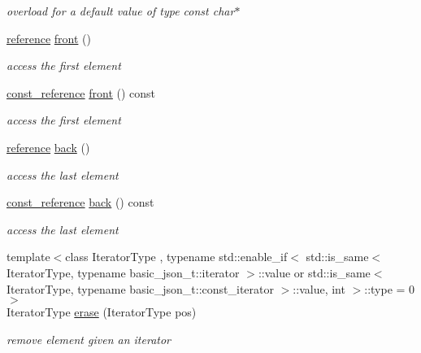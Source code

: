 \begin{DoxyCompactItemize}
\begin{DoxyCompactList}\small\item\em overload for a default value of type const char$\ast$ \end{DoxyCompactList}\item 
\hyperlink{classnlohmann_1_1basic__json_ac6a5eddd156c776ac75ff54cfe54a5bc}{reference} \hyperlink{classnlohmann_1_1basic__json_a3acba9c6ceb7214e565fe08c3ba5b352}{front} ()
\begin{DoxyCompactList}\small\item\em access the first element \end{DoxyCompactList}\item 
\hyperlink{classnlohmann_1_1basic__json_a4057c5425f4faacfe39a8046871786ca}{const\+\_\+reference} \hyperlink{classnlohmann_1_1basic__json_a4b1fb3671ade9afc8d33b2c9510acbfc}{front} () const
\begin{DoxyCompactList}\small\item\em access the first element \end{DoxyCompactList}\item 
\hyperlink{classnlohmann_1_1basic__json_ac6a5eddd156c776ac75ff54cfe54a5bc}{reference} \hyperlink{classnlohmann_1_1basic__json_a011397134847f36db0ed7d7a93753677}{back} ()
\begin{DoxyCompactList}\small\item\em access the last element \end{DoxyCompactList}\item 
\hyperlink{classnlohmann_1_1basic__json_a4057c5425f4faacfe39a8046871786ca}{const\+\_\+reference} \hyperlink{classnlohmann_1_1basic__json_a83fe4a151b3a591f357527d5d9aa1b9f}{back} () const
\begin{DoxyCompactList}\small\item\em access the last element \end{DoxyCompactList}\item 
{\footnotesize template$<$class Iterator\+Type , typename std\+::enable\+\_\+if$<$ std\+::is\+\_\+same$<$ Iterator\+Type, typename basic\+\_\+json\+\_\+t\+::iterator $>$\+::value or std\+::is\+\_\+same$<$ Iterator\+Type, typename basic\+\_\+json\+\_\+t\+::const\+\_\+iterator $>$\+::value, int $>$\+::type  = 0$>$ }\\Iterator\+Type \hyperlink{classnlohmann_1_1basic__json_a068a16e76be178e83da6a192916923ed}{erase} (Iterator\+Type pos)
\begin{DoxyCompactList}\small\item\em remove element given an iterator \end{DoxyCompactList}\item 

\end{DoxyCompactItemize}
